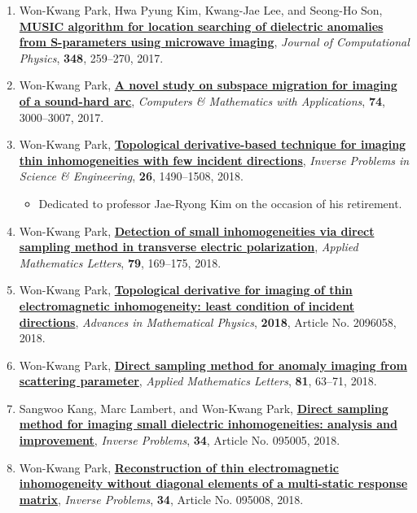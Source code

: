 \documentclass[10pt,A4]{article}
\begin{document}
\begin{enumerate}
\item\label{A-JCOMP2017B} Won-Kwang Park, Hwa Pyung Kim, Kwang-Jae Lee, and Seong-Ho Son, \href{http://dx.doi.org/10.1016/j.jcp.2017.07.035}{\textbf{MUSIC algorithm for location searching of dielectric anomalies from S-parameters using microwave imaging}}, \textit{Journal of Computational Physics}, \textbf{348}, 259--270, 2017.
\item\label{A-CAMWA2017B} Won-Kwang Park, \href{http://dx.doi.org/10.1016/j.camwa.2017.07.045}{\textbf{A novel study on subspace migration for imaging of a sound-hard arc}}, \textit{Computers \& Mathematics with Applications}, \textbf{74}, 3000--3007, 2017.
\item\label{A-GIPE2018} Won-Kwang Park, \href{http://dx.doi.org/10.1080/17415977.2017.1411913}{\textbf{Topological derivative-based technique for imaging thin inhomogeneities with few incident directions}}, \textit{Inverse Problems in Science \& Engineering}, \textbf{26}, 1490--1508, 2018.
    \begin{itemize}
      \item Dedicated to professor Jae-Ryong Kim on the occasion of his retirement.
    \end{itemize}
\item\label{A-AML2018A} Won-Kwang Park, \href{https://doi.org/10.1016/j.aml.2017.12.016}{\textbf{Detection of small inhomogeneities via direct sampling method in transverse electric polarization}}, \textit{Applied Mathematics Letters}, \textbf{79}, 169--175, 2018.
\item\label{A-AMP2018} Won-Kwang Park, \href{https://doi.org/10.1155/2018/2096058}{\textbf{Topological derivative for imaging of thin electromagnetic inhomogeneity: least condition of incident directions}}, \textit{Advances in Mathematical Physics}, \textbf{2018}, Article No. 2096058, 2018.
\item\label{A-AML2018B} Won-Kwang Park, \href{https://doi.org/10.1016/j.aml.2018.02.001}{\textbf{Direct sampling method for anomaly imaging from scattering parameter}}, \textit{Applied Mathematics Letters}, \textbf{81}, 63--71, 2018.
\item\label{A-IP2018A} Sangwoo Kang, Marc Lambert, and Won-Kwang Park, \href{https://doi.org/10.1088/1361-6420/aacf1d}{\textbf{Direct sampling method for imaging small dielectric inhomogeneities: analysis and improvement}}, \textit{Inverse Problems}, \textbf{34}, Article No. 095005, 2018.
\item\label{A-IP2018B} Won-Kwang Park, \href{https://doi.org/10.1088/1361-6420/aad20c}{\textbf{Reconstruction of thin electromagnetic inhomogeneity without diagonal elements of a multi-static response matrix}}, \textit{Inverse Problems}, \textbf{34}, Article No. 095008, 2018.

\end{enumerate}
\end{document}
